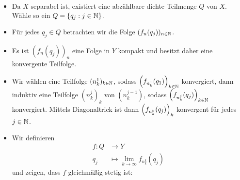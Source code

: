 \begin{beweis}
	\mbox{} \\[-.9cm]
	\begin{itemize}
		\item Da $X$ separabel ist, existiert eine abzählbare dichte Teilmenge $Q$ von $X$.
		Wähle so ein $Q = \{q_j : j \in \NN\}$.
		\item Für jedes $q_j \in Q$ betrachten wir die Folge $(f_n(q_j))_{n \in \NN}$.
		\item Es ist $(f_n(q_j))_n$ eine Folge in $Y$ kompakt und besitzt daher eine konvergente Teilfolge.
		\item Wir wählen eine Teilfolge $(n_k^1)_{k \in \NN}$, sodass $\enbrace*{f_{n_k^1}(q_1)}_{k \in \NN}$ konvergiert, dann induktiv eine Teilfolge $(n_k^j)_k$ von $(n_k^{j-1})$, sodass $\enbrace*{f_{n_k^j}(q_j)}_{k \in \NN}$ konvergiert.
		Mittels Diagonaltrick ist dann $\enbrace*{f_{n_k^k}(q_j)}_k$ konvergent für jedes $j \in \NN$.
		\item Wir definieren 
		\begin{align*}
			f \colon Q &\longrightarrow Y \\
			q_j &\longmapsto \lim\limits_{k \rightarrow \infty} f_{n_k^k}(q_j)
		\end{align*}
		und zeigen, dass $f$ gleichmäßig stetig ist:
		

\end{itemize}
\end{beweis}
